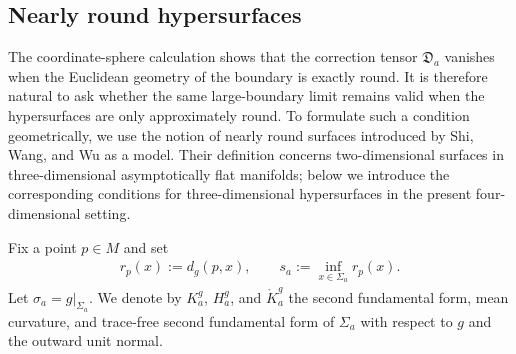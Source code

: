 \documentclass[10pt]{amsart}
\theoremstyle{plain}
\theoremstyle{remark}
\begin{document}
	\subsection{Nearly round hypersurfaces}\label{subsec:nearly-round-surface-BY-mass}
	
	
	The coordinate-sphere calculation shows that the correction tensor
	$\mathfrak D_a$ vanishes when the Euclidean geometry of the boundary is
	exactly round. It is therefore natural to ask whether the same
	large-boundary limit remains valid when the hypersurfaces are only
	approximately round. To formulate such a condition geometrically, we
	use the notion of nearly round surfaces introduced by Shi, Wang, and Wu
	\cite{ShiWangWu} as a model. Their definition concerns
	two-dimensional surfaces in three-dimensional asymptotically flat
	manifolds; below we introduce the corresponding conditions for
	three-dimensional hypersurfaces in the present four-dimensional
	setting.
	
	Fix a point $p\in M$ and set
	\begin{align*}
		r_p(x)
		:=
		d_g(p,x),
		\qquad
		s_a
		:=
		\inf_{x\in\Sigma_a}r_p(x).
	\end{align*}
	Let $\sigma_a=g|_{\Sigma_a}$. We denote by $K_a^g$, $H_a^g$, and
	$\mathring K_a^g$ the second fundamental form, mean curvature, and
	trace-free second fundamental form of $\Sigma_a$ with respect to $g$
	and the outward unit normal.
	
\end{document}
